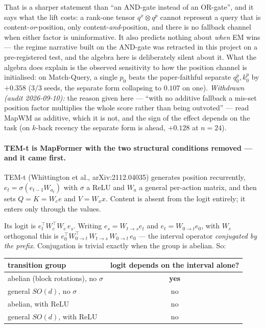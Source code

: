 \documentclass[11pt]{article}
\begin{document}
That is a sharper statement than ``an AND-gate instead of an OR-gate'', and it says
what the lift costs: a rank-one tensor $q^x\otimes q^p$ cannot represent a query
that is content-\emph{or}-position, only content-\emph{and}-position, and there is
no fallback channel when either factor is uninformative. It also predicts nothing
about \emph{when} EM wins --- the regime narrative built on the AND-gate was
retracted in this project on a pre-registered test, and the algebra here is
deliberately silent about it. What the algebra does explain is the observed
sensitivity to how the position channel is initialised: on Match-Query, a single
$p_0$ beats the paper-faithful separate $q^p_0, k^p_0$ by $+0.358$ ($3/3$ seeds,
the separate form collapsing to $0.107$ on one). \emph{Withdrawn (audit
2026-09-10):} the reason given here --- ``with no additive fallback a mis-set position
factor multiplies the whole score rather than being outvoted'' --- read MapWM as
additive, which it is not, and the sign of the effect depends on the task (on
$k$-back recency the separate form is ahead, $+0.128$ at $n=24$).

\paragraph{TEM-t is MapFormer with the two structural conditions removed --- and it
came first.} TEM-t (Whittington et al., arXiv:2112.04035) generates position
recurrently, $e_t = \sigma(e_{t-1}W_{a_t})$ with $\sigma$ a ReLU and $W_a$ a general
per-action matrix, and then sets $Q = K = W_e e$ and $V = W_x x$. Content is absent
from the logit entirely; it enters only through the values.

Its logit is $e_t^\top W_e^\top W_e\, e_s$. Writing $e_s = W_{t\to s}e_t$ and
$e_t = W_{0\to t}e_0$, with $W_e$ orthogonal this is
$e_0^\top W_{0\to t}^{\top}\,W_{t\to s}\,W_{0\to t}\,e_0$ --- the interval operator
\emph{conjugated by the prefix}. Conjugation is trivial exactly when the group is
abelian. So:

\begin{center}\small
\begin{tabular}{lc}
\toprule
transition group & logit depends on the interval alone? \\
\midrule
abelian (block rotations), no $\sigma$ & \textbf{yes} \\
general $SO(d)$, no $\sigma$           & no \\
abelian, with ReLU                     & no \\
general $SO(d)$, with ReLU             & no \\
\bottomrule
\end{tabular}
\end{center}
\end{document}

